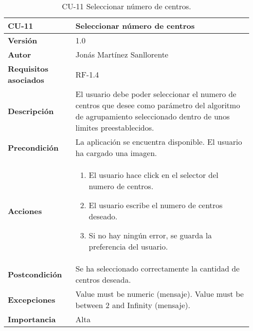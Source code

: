 \begin{table}[p]
	\centering
	\begin{tabularx}{\linewidth}{ p{} p{} }
		\toprule
		\textbf{CU-11}    & \textbf{Seleccionar número de centros}\\
		\toprule
		\textbf{Versión}              & 1.0    \\
		\textbf{Autor}                & Jonás Martínez Sanllorente \\
		\textbf{Requisitos asociados} & RF-1.4 \\
		\textbf{Descripción}          & El usuario debe poder seleccionar el numero de centros que desee como parámetro del algoritmo de agrupamiento seleccionado dentro de unos limites preestablecidos. \\
		\textbf{Precondición}         & La aplicación se encuentra disponible.\newline
                                        El usuario ha cargado una imagen. \\
		\textbf{Acciones}             &
		\begin{enumerate}
			\def\labelenumi{\arabic{enumi}.}
			\tightlist
			\item El usuario hace click en el selector del numero de centros.
            \item El usuario escribe el numero de centros deseado.
			\item Si no hay ningún error, se guarda la preferencia del usuario.
		\end{enumerate}\\
		\textbf{Postcondición}        & Se ha seleccionado correctamente la cantidad de centros deseada. \\
		\textbf{Excepciones}          & Value must be numeric (mensaje).\newline
                                        Value must be between 2 and Infinity (mensaje).\\
		\textbf{Importancia}          & Alta \\
		\bottomrule
	\end{tabularx}
	\caption{CU-11 Seleccionar número de centros.}
\end{table}


